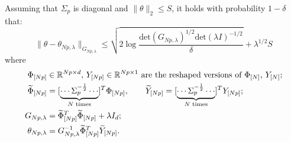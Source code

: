 \documentclass{article}
\begin{document}
\begin{lemma}
Assuming that $\Sigma_p$ is diagonal and $\|\theta\|_2\leq S$, it holds with probability $1-\delta$ that:
\begin{equation}
    \label{eq:confidence-ellipsoid}
    \|\theta - \theta_{Np,\lambda}\|_{G_{Np,\lambda}} \leq \sqrt{2\log \frac{\text{det}(G_{Np,\lambda})^{1/2}\text{det}(\lambda I)^{-1/2}}{\delta}} + \lambda^{1/2}S
\end{equation}
where
\begin{align*}
    \Phi_{[Np]}& \in\mathbb{R}^{Np\times d},\, Y_{[Np]}\in \mathbb{R}^{Np\times 1} \text{ are the reshaped versions of $\Phi_{[N]}$, $Y_{[N]}$};\\
    \widetilde{\Phi}_{[Np]} &= [\underbrace{\cdots \Sigma_p^{-\frac{1}{2}} \cdots}_{\text{$N$ times}}]^T \Phi_{[Np]} , \qquad  \widetilde{Y}_{[Np]} = [\underbrace{\cdots \Sigma_p^{-\frac{1}{2}} \cdots}_{\text{$N$ times}}]^TY_{[Np]};\\
    G_{Np, \lambda} &= \widetilde{\Phi}^T_{[Np]}\widetilde{\Phi}_{[Np]} + \lambda I_d;\\
    \theta_{Np,\lambda} &= G_{Np, \lambda}^{-1} \widetilde{\Phi}^T_{[Np]}\widetilde{Y}_{[Np]}.
\end{align*}
\end{lemma}
\end{document}

